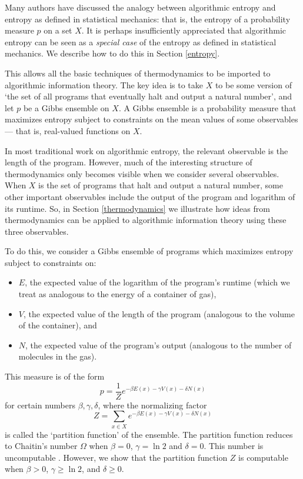 \documentclass[12pt,twoside,openright]{report}
\begin{document}
Many authors \cite{BGLVZ, Chaitin1975, FT1982, Kolmogorov1965, LevinZvonkin, Solomonoff1964, Szilard1929, Tadaki2008} have discussed the analogy between algorithmic entropy and entropy as defined in statistical mechanics: that is, the entropy of a probability measure $p$ on a set $X$.  It is perhaps insufficiently appreciated that algorithmic entropy can be seen as a \textit{special case} of the entropy as defined in statistical mechanics.  We describe how to do this in Section \ref{entropy}.

This allows all the basic techniques of thermodynamics to be imported to algorithmic information theory.  The key idea is to take $X$ to be some version of `the set of all programs that eventually halt and output a natural number', and let $p$ be a Gibbs ensemble on $X$.  A
Gibbs ensemble is a probability measure that maximizes entropy subject to constraints on the mean values of some observables --- that is, real-valued functions on $X$.

In most traditional work on algorithmic entropy, the relevant observable is the length of the program.  However, much of the interesting structure of thermodynamics only becomes visible when we consider several observables.  When $X$ is the set of programs that halt and output a natural number, some other important observables include the output of the program and logarithm of its runtime.  So, in Section \ref{thermodynamics} we illustrate how ideas from thermodynamics can be applied to algorithmic information theory using these three observables.  

To do this, we consider a Gibbs ensemble of programs which maximizes entropy subject to constraints on:
\begin{itemize}
\item
$E$, the expected value of the logarithm of the program's runtime (which we treat as analogous to the energy of a container of gas),
\item 
$V$, the expected value of the length of the program (analogous to the volume of the container), and 
\item
$N$, the expected value of the program's output (analogous to the number of molecules in the gas).
\end{itemize}
This measure is of the form
\[       p = \frac{1}{Z} e^{-\beta E(x) -\gamma V(x) - \delta N(x)} \]
for certain numbers $\beta, \gamma, \delta$, where the normalizing factor
\[     Z = \sum_{x \in X} e^{-\beta E(x) -\gamma V(x) - \delta N(x)} \]
is called the `partition function' of the ensemble.  The partition function reduces to Chaitin's number $\Omega$ when $\beta = 0$, $\gamma = \ln 2$ and $\delta = 0$.  This number is uncomputable \cite{Chaitin1975}.  However, we show that the partition function $Z$ is computable when $\beta > 0$, $\gamma \ge \ln 2$, and $\delta \ge 0$.
\end{document}

